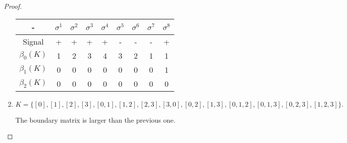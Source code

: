\begin{proof}
\begin{enumerate}
    \begin{center}
        \begin{tabular}{ c|c|c|c|c|c|c|c|c}
         - & $\sigma^1$ & $\sigma^2$ & $\sigma^3$ & $\sigma^4$ & $\sigma^5$ &
         $\sigma^6$ & $\sigma^7$ &$\sigma^8$ \\ 
         \hline
         Signal & + & + & + & + & - & - & - & + \\  
         $\beta_0(K)$ & 1 & 2 & 3 & 4 & 3 & 2 & 1 & 1 \\ 
         $\beta_1(K)$ & 0 & 0 & 0 & 0 & 0 & 0 & 0 & 1\\     
         $\beta_2(K)$ & 0 & 0 & 0 & 0 & 0 & 0 & 0 & 0\\     

        \end{tabular}
    \end{center}

    \item  $K = \{[0], [1], [2], [3], [0, 1], [1, 2], [2, 3], [3, 0], [0, 2], [1, 3], [0, 1, 2], [0, 1, 3], [0, 2, 3], [1, 2, 3]\}.
    $
    
    The boundary matrix is larger than the previous one. 


\end{enumerate}
\end{proof}
